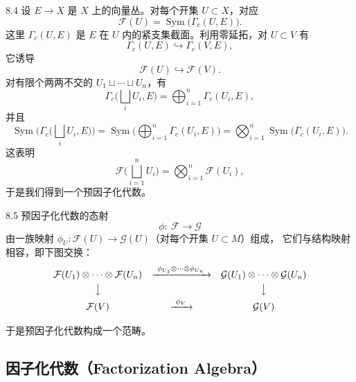 \begin{wexam}{8.4}
  设 $E\to X$ 是 $X$ 上的向量丛。对每个开集 $U\subset X$，对应
  \[
    \mathcal{F}(U)=\operatorname{Sym}\big(\Gamma_c(U,E)\big).
  \]
  这里 $\Gamma_c(U,E)$ 是 $E$ 在 $U$ 内的紧支集截面。利用零延拓，对 $U\subset V$ 有
  \[
    \Gamma_c(U,E)\hookrightarrow\Gamma_c(V,E),
  \]
  它诱导
  \[
    \mathcal{F}(U)\hookrightarrow\mathcal{F}(V).
  \]
  对有限个两两不交的 $U_1\sqcup\cdots\sqcup U_n$，有
  \[
    \Gamma_c\Big(\bigsqcup_i U_i,E\Big)=\bigoplus_{i=1}^{n}\Gamma_c(U_i,E),
  \]
  并且
  \[
    \operatorname{Sym}\Big(\Gamma_c\big(\bigsqcup_i U_i,E\big)\Big)
    =\operatorname{Sym}\Big(\bigoplus_{i=1}^{n}\Gamma_c(U_i,E)\Big)
    =\bigotimes_{i=1}^{n}\operatorname{Sym}\big(\Gamma_c(U_i,E)\big).
  \]
  这表明
  \[
    \mathcal{F}\Big(\bigsqcup_{i=1}^{n}U_i\Big)=\bigotimes_{i=1}^{n}\mathcal{F}(U_i),
  \]
  于是我们得到一个预因子化代数。
\end{wexam}


\begin{wdefn}{8.5}
  预因子化代数的态射
  \[
    \phi:\ \mathcal{F}\longrightarrow\mathcal{G}
  \]
  由一族映射 $\phi_U:\mathcal{F}(U)\to\mathcal{G}(U)$（对每个开集 $U\subset M$）组成，
  它们与结构映射相容，即下图交换：
  \[
    \begin{array}{ccc}
      \mathcal{F}(U_1)\otimes\cdots\otimes\mathcal{F}(U_n)
        & \xrightarrow{\ \phi_{U_1}\otimes\cdots\otimes\phi_{U_n}\ }
        & \mathcal{G}(U_1)\otimes\cdots\otimes\mathcal{G}(U_n)\\[1mm]
      \big\downarrow & & \big\downarrow\\[1mm]
      \mathcal{F}(V) & \xrightarrow{\ \phi_V\ } & \mathcal{G}(V)
    \end{array}
  \]
\end{wdefn}

于是预因子化代数构成一个范畴。

\subsection{因子化代数（Factorization Algebra）}

